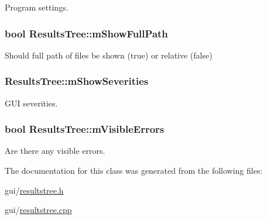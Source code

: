 Program settings. 

\hypertarget{class_results_tree_ab09fc442b721823c61da0e735ae529c2}{
\subsubsection[{m\-Show\-Full\-Path}]{\setlength{\rightskip}{0pt plus 5cm}bool Results\-Tree\-::m\-Show\-Full\-Path\hspace{0.3cm}{\ttfamily [protected]}}}\label{class_results_tree_ab09fc442b721823c61da0e735ae529c2}


Should full path of files be shown (true) or relative (false) 

\hypertarget{class_results_tree_a5c18a240324385c3d7eea5fd247ffe95}{
\subsubsection[{m\-Show\-Severities}]{ Results\-Tree\-::m\-Show\-Severities}}\label{class_results_tree_a5c18a240324385c3d7eea5fd247ffe95}


G\-U\-I severities. 

\hypertarget{class_results_tree_a60ddd8ebf2e1ee75765a4de8bbcf3f05}{
\subsubsection[{m\-Visible\-Errors}]{\setlength{\rightskip}{0pt plus 5cm}bool Results\-Tree\-::m\-Visible\-Errors\hspace{0.3cm}{\ttfamily [protected]}}}\label{class_results_tree_a60ddd8ebf2e1ee75765a4de8bbcf3f05}


Are there any visible errors. 



The documentation for this class was generated from the following files\-:\begin{DoxyCompactItemize}
\item 
gui/\hyperlink{resultstree_8h}{resultstree.\-h}\item 
gui/\hyperlink{resultstree_8cpp}{resultstree.\-cpp}\end{DoxyCompactItemize}
